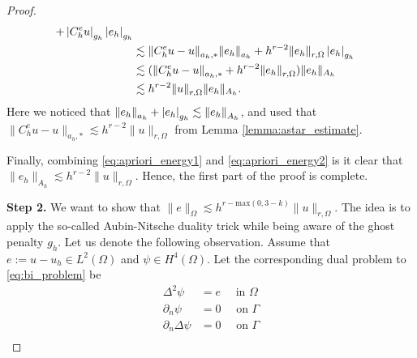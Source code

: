 \begin{proof}
\begin{equation}
\begin{split}
        + \left\lvert  C _{h}^{e}u  \right\rvert_{g_{h}} \left\lvert e_{h}   \right\rvert_{g_{h}} \\
         &\lesssim \| C _{h}^{e} u - u \|_{a_{h},*  }^{  } \| e_{h} \|_{a_{h}  }^{  } + h^{r-2} \| e_{h} \|_{r, \Omega   }^{  }\left\lvert e_{h}   \right\rvert_{g_{h}} \\
         &\lesssim (\| C _{h}^{e} u - u \|_{a_{h},*  }^{  } + h^{r-2} \| e_{h} \|_{r, \Omega   }^{  }) \|e_{h}\|_{A_{h}} \\
         &\lesssim  h^{r-2} \| u \|_{r, \Omega   }^{  } \|e_{h}\|_{A_{h}}.
    \end{split}
\end{equation}
Here we noticed that $\| e_{h} \|_{a_{h}  }^{  } + \left\lvert e_{h}   \right\rvert_{g_{h}} \lesssim \| e_{h} \|_{ A_{h} }^{  }  $, and used that $\| C _{h}^{e} u - u \|_{a_{h},*  }^{  } \lesssim h^{r-2}\| u \|_{ r,\Omega  }^{  }  $ from Lemma
\ref{lemma:astar_estimate}.

Finally, combining \eqref{eq:apriori_energy1} and \eqref{eq:apriori_energy2} is it clear that $\| e_{h} \|_{ A_{h}  }^{  } \lesssim h^{r-2} \| u \|_{r, \Omega   }^{  }  $.
Hence, the first part of the proof is complete.

        \textbf{Step 2.}
        We want to show that $ \| e \|_{ \Omega  }^{  } \lesssim   h^{r- \mathrm{max}(0,3-k)} \| u \|_{ r ,\Omega  }^{  }$. The idea is to apply the so-called Aubin-Nitsche duality trick while being aware of the ghost penalty $g_{h}$. Let us denote the following
        observation.
        Assume that $e:= u -u_{h} \in L^{2}( \Omega ) $ and $\psi  \in H^{4}( \Omega ) $.
        Let the corresponding dual problem to \eqref{eq:bi_problem} be
        \begin{equation}
            \begin{split}
            \Delta ^2 \psi &= e  \quad  \text{ in } \Omega  \\
            \partial _{n} \psi &= 0 \quad \text{ on } \Gamma \\
            \partial _{n} \Delta \psi & = 0 \quad  \text{ on } \Gamma   \\
            \end{split}
        \end{equation}


\end{proof}
